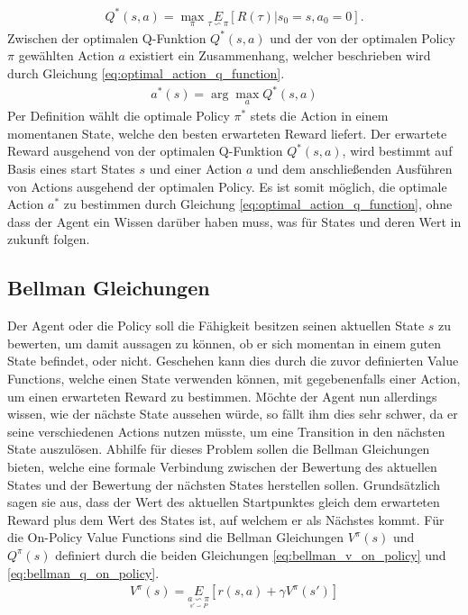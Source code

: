 \documentclass[]{iat}
\begin{document}
\begin{align}
    Q^{*}(s,a) = \underset{\pi}{\max}\underset{\tau \backsim \pi}{E}\left[R(\tau)|s_0 = s, a_0=0\right]. \label{eq:optimal_action_value_function}
\end{align}
Zwischen der optimalen Q-Funktion $Q^*(s,a)$ und der von der optimalen Policy $\pi$ gewählten Action $a$ existiert ein Zusammenhang, welcher beschrieben wird durch Gleichung \ref{eq:optimal_action_q_function}.
\begin{align}
    a^*(s) = \arg \max_a Q^* (s,a) \label{eq:optimal_action_q_function}
\end{align}
Per Definition wählt die optimale Policy $\pi^*$ stets die Action in einem momentanen State, welche den besten erwarteten Reward liefert. Der erwartete Reward ausgehend von der optimalen Q-Funktion $Q^*(s,a)$, wird bestimmt auf Basis eines start States $s$ und einer Action $a$ und dem anschließenden Ausführen von Actions ausgehend der optimalen Policy. Es ist somit möglich, die optimale Action $a^*$ zu bestimmen durch Gleichung \ref{eq:optimal_action_q_function}, ohne dass der Agent ein Wissen darüber haben muss, was für States und deren Wert in zukunft folgen. \cite[]{SpinningUp2018} \cite[]{Sutton1998}

\subsection{Bellman Gleichungen}
Der Agent oder die Policy soll die Fähigkeit besitzen seinen aktuellen State $s$ zu bewerten, um damit aussagen zu können, ob er sich momentan in einem guten State befindet, oder nicht. Geschehen kann dies durch die zuvor definierten Value Functions, welche einen State verwenden können, mit gegebenenfalls einer Action, um einen erwarteten Reward zu bestimmen. Möchte der Agent nun allerdings wissen, wie der nächste State aussehen würde, so fällt ihm dies sehr schwer, da er seine verschiedenen Actions nutzen müsste, um eine Transition in den nächsten State auszulösen. Abhilfe für dieses Problem sollen die Bellman Gleichungen bieten, welche eine formale Verbindung zwischen der Bewertung des aktuellen States und der Bewertung der nächsten States herstellen sollen. Grundsätzlich sagen sie aus, dass der Wert des aktuellen Startpunktes gleich dem erwarteten Reward plus dem Wert des States ist, auf welchem er als Nächstes kommt. Für die On-Policy Value Functions sind die Bellman Gleichungen $V^{\pi}(s)$ und $Q^{\pi}(s)$ definiert durch die beiden Gleichungen \ref{eq:bellman_v_on_policy} und \ref{eq:bellman_q_on_policy}.
\begin{align}
    V^{\pi}(s) = \underset{\underset{s' \backsim P}{a \backsim \pi}}{E}\left[r(s,a)+\gamma V^{\pi}(s')\right] \label{eq:bellman_v_on_policy}
\end{align}
\end{document}
